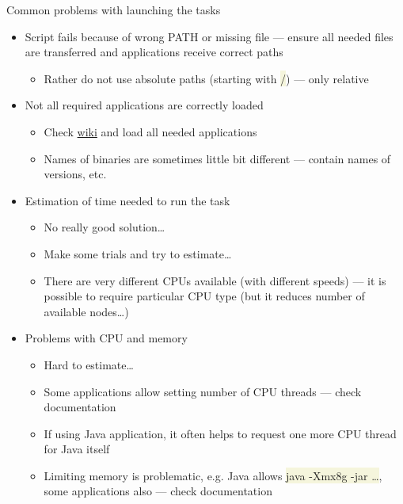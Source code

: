 \documentclass[compress, ucs, xelatex, 11pt, xcolor=svgnames, aspectratio=169,
	hyperref={
		bookmarks=true,
		unicode=true,
		colorlinks=true,
		pdftitle={Linux, command line and MetaCentrum},
		plainpages=false,
		pdfauthor={Vojtech Zeisek},
		pdfsubject={Course about use of Linux command line, writing shell scripts and using MetaCentrum of CESNET},
		pdfcreator={XeLaTeX},
		pdfkeywords={Linux, GNU, BASH, shell, command line, MetaCentrum},
		linkcolor=DarkRed, %
		anchorcolor=DarkBlue, %
		citecolor=Indigo, %
		filecolor=NavyBlue, %
		menucolor=DarkMagenta, %
		urlcolor=DarkBlue, %
		pdftex},
	url={hyphens, lowtilde} %
	]{beamer}
\renewcommand{\texttt}[1]{\colorbox{Beige}{{\ttfamily #1}}}
\begin{document}
\begin{frame}{Common problems with launching the tasks}
	\begin{itemize}
		\item Script fails because of wrong PATH or missing file --- ensure all needed files are transferred and applications receive correct paths
		\begin{itemize}
			\item Rather do not use absolute paths (starting with \texttt{/}) --- only relative
		\end{itemize}
		\item Not all required applications are correctly loaded
		\begin{itemize}
			\item Check \href{https://wiki.metacentrum.cz/wiki/Kategorie:Applications}{wiki} and load all needed applications
			\item Names of binaries are sometimes little bit different --- contain names of versions, etc.
		\end{itemize}
		\item Estimation of time needed to run the task
		\begin{itemize}
			\item No really good solution\ldots
			\item Make some trials and try to estimate\ldots
			\item There are very different CPUs available (with different speeds) --- it is possible to require particular CPU type (but it reduces number of available nodes\ldots)
		\end{itemize}
		\item Problems with CPU and memory
		\begin{itemize}
			\item Hard to estimate\ldots
			\item Some applications allow setting number of CPU threads --- check documentation
			\item If using Java application, it often helps to request one more CPU thread for Java itself
			\item Limiting memory is problematic, e.g. Java allows \texttt{java -Xmx8g -jar \ldots}, some applications also --- check documentation
		\end{itemize}
	\end{itemize}
\end{frame}
\end{document}
